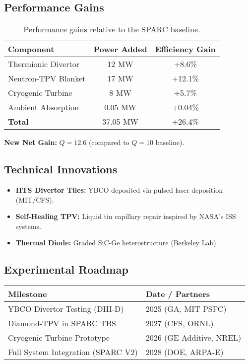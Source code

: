 \documentclass[12pt]{article}
\begin{document}
\subsection{Performance Gains}
\begin{table}[h]
\centering
\begin{tabular}{lcc}
\toprule
\textbf{Component} & \textbf{Power Added} & \textbf{Efficiency Gain} \\
\midrule
Thermionic Divertor & 12 MW  & +8.6\% \\
Neutron-TPV Blanket  & 17 MW  & +12.1\% \\
Cryogenic Turbine   & 8 MW   & +5.7\% \\
Ambient Absorption  & 0.05 MW & +0.04\% \\
\midrule
\textbf{Total}      & 37.05 MW & +26.4\% \\
\bottomrule
\end{tabular}
\caption{Performance gains relative to the SPARC baseline.}
\end{table}

\noindent \textbf{New Net Gain:} $Q = 12.6$ (compared to $Q = 10$ baseline).

\subsection{Technical Innovations}
\begin{itemize}
    \item \textbf{HTS Divertor Tiles:} YBCO deposited via pulsed laser deposition (MIT/CFS).
    \item \textbf{Self-Healing TPV:} Liquid tin capillary repair inspired by NASA's ISS systems.
    \item \textbf{Thermal Diode:} Graded SiC-Ge heterostructure (Berkeley Lab).
\end{itemize}

\subsection{Experimental Roadmap}
\begin{center}
\begin{tabular}{ll}
\toprule
\textbf{Milestone} & \textbf{Date / Partners} \\
\midrule
YBCO Divertor Testing (DIII-D) & 2025 (GA, MIT PSFC) \\
Diamond-TPV in SPARC TBS & 2027 (CFS, ORNL) \\
Cryogenic Turbine Prototype & 2026 (GE Additive, NREL) \\
Full System Integration (SPARC V2) & 2028 (DOE, ARPA-E) \\
\bottomrule
\end{tabular}
\end{center}
\end{document}

